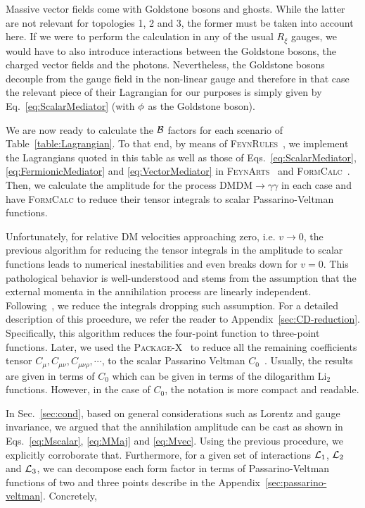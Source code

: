 Massive vector fields  come with Goldstone bosons and ghosts. While the latter are not relevant for topologies 1, 2 and 3, the former must be taken into account here. If we were to perform the calculation in any of the usual $R_\xi$ gauges, we would have to also introduce interactions between the Goldstone bosons, the charged vector fields and the photons. Nevertheless, the Goldstone bosons decouple from the gauge field  in the non-linear gauge and therefore in that case the relevant piece of their Lagrangian for our purposes  is simply given by Eq.~\eqref{eq:ScalarMediator} (with ${\phi}$ as the Goldstone boson).  
 
We are now ready  to calculate the ${\cal B}$ factors  for each scenario of Table~\ref{table:Lagrangian}. To that end, by means of \textsc{FeynRules}~\cite{Christensen:2008py,Alloul:2013bka},  we implement the Lagrangians quoted in this table as well as  those of Eqs.~\eqref{eq:ScalarMediator},\eqref{eq:FermionicMediator} and \eqref{eq:VectorMediator} in \textsc{FeynArts}~\cite{Hahn:2000kx} and \textsc{FormCalc}~\cite{Hahn:1998yk}. Then, we calculate the amplitude for the process DMDM$\to\gamma\gamma$ in each case and have \textsc{FormCalc} to reduce their tensor integrals to scalar Passarino-Veltman functions.

Unfortunately, for relative DM velocities approaching zero, i.e. $v\to0$, the previous algorithm for reducing the  tensor integrals in the amplitude to scalar functions leads to numerical inestabilities and even breaks down for $v=0$. This pathological behavior is well-understood and stems from the assumption that the external momenta in the annihilation process are linearly independent. Following~\cite{STUART1988367}, we reduce the integrals dropping such assumption. For a detailed description of this procedure, we refer the reader to Appendix~\ref{sec:CD-reduction}.
Specifically, this algorithm reduces the four-point function to three-point functions. Later, we used the \textsc{Package-X}~\cite{Patel:2015tea} to reduce all the remaining coefficients tensor $C_{\mu},C_{\mu\nu},C_{\mu\nu\rho}, \cdots $, to the scalar Passarino Veltman $C_0$~\cite{Passarino:1978jh}. Usually, the results are given in terms of $C_0$ which can be given in terms of the dilogarithm Li$_{2}$ functions. However, in the case of $C_0$, the notation is more compact and readable.

In Sec.~\ref{sec:cond}, based on general considerations such as Lorentz and gauge invariance, we argued that the annihilation amplitude can be cast as shown in Eqs.~\eqref{eq:Mscalar}, \eqref{eq:MMaj} and \eqref{eq:Mvec}. Using the previous procedure, we explicitly  corroborate  that. Furthermore, for a given set of interactions ${\cal L}_1$, ${\cal L}_2$ and ${\cal L}_3$, we can decompose each form factor in terms of Passarino-Veltman functions of two and three points describe in the Appendix~\ref{sec:passarino-veltman}. Concretely,

